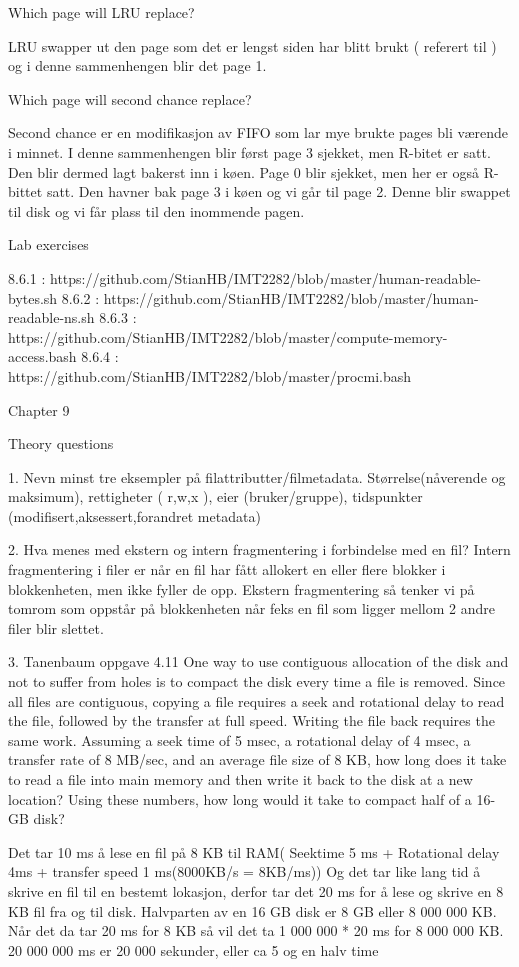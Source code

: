 Which page will LRU replace?

LRU swapper ut den page som det er lengst siden har blitt brukt ( referert til ) og i denne sammenhengen blir det page 1. 

Which page will second chance replace?

Second chance er en modifikasjon av FIFO som lar mye brukte pages bli værende i minnet. I denne sammenhengen blir først page 3 sjekket, men R-bitet er satt. Den blir dermed lagt bakerst inn i køen. Page 0 blir sjekket, men her er også R-bittet satt. Den havner bak page 3 i køen og vi går til page 2. Denne blir swappet til disk og vi får plass til den inommende pagen.

Lab exercises

8.6.1 : https://github.com/StianHB/IMT2282/blob/master/human-readable-bytes.sh
8.6.2 : https://github.com/StianHB/IMT2282/blob/master/human-readable-ns.sh
8.6.3 : https://github.com/StianHB/IMT2282/blob/master/compute-memory-access.bash
8.6.4 : https://github.com/StianHB/IMT2282/blob/master/procmi.bash

Chapter 9

Theory questions

1. Nevn minst tre eksempler på filattributter/filmetadata.
Størrelse(nåverende og maksimum), rettigheter ( r,w,x ), eier (bruker/gruppe), tidspunkter (modifisert,aksessert,forandret metadata)

2. Hva menes med ekstern og intern fragmentering i forbindelse med en fil?
Intern fragmentering i filer er når en fil har fått allokert en eller flere blokker i blokkenheten, men ikke fyller de opp. Ekstern fragmentering så tenker vi på tomrom som oppstår på blokkenheten når feks en fil som ligger mellom 2 andre filer blir slettet. 

3. Tanenbaum oppgave 4.11
One way to use contiguous allocation of the disk and not to suffer from holes is to compact the disk every time a file is removed. Since all files are contiguous, copying a file requires a seek and rotational delay to read the file, followed by the transfer at full speed. Writing the file back requires the same work. Assuming a seek time of 5 msec, a rotational delay of 4 msec, a transfer rate of 8 MB/sec, and an average file size of 8 KB, how long does it take to read a file into main memory and then write it back to the disk at a new location? Using these numbers, how long would it take to compact half of a 16-GB disk?

Det tar 10 ms å lese en fil på 8 KB til RAM( Seektime 5 ms + Rotational delay 4ms + transfer speed 1 ms(8000KB/s = 8KB/ms))
Og det tar like lang tid å skrive en fil til en bestemt lokasjon, derfor tar det 20 ms for å lese og skrive en 8 KB fil fra og til disk.
Halvparten av en 16 GB disk er 8 GB eller 8 000 000 KB. Når det da tar 20 ms for 8 KB så vil det ta 1 000 000 * 20 ms for 8 000 000 KB.
20 000 000 ms er 20 000 sekunder, eller ca 5 og en halv time

